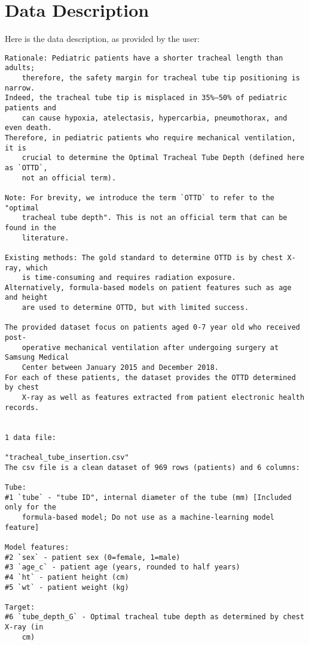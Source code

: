 \documentclass[11pt]{article}
\begin{document}
\clearpage
\appendix

\section{Data Description} \label{sec:data_description} Here is the data description, as provided by the user:

\begin{Verbatim}[tabsize=4]
Rationale: Pediatric patients have a shorter tracheal length than adults;
	therefore, the safety margin for tracheal tube tip positioning is narrow.
Indeed, the tracheal tube tip is misplaced in 35%–50% of pediatric patients and
	can cause hypoxia, atelectasis, hypercarbia, pneumothorax, and even death.
Therefore, in pediatric patients who require mechanical ventilation, it is
	crucial to determine the Optimal Tracheal Tube Depth (defined here as `OTTD`,
	not an official term).

Note: For brevity, we introduce the term `OTTD` to refer to the "optimal
	tracheal tube depth". This is not an official term that can be found in the
	literature.

Existing methods: The gold standard to determine OTTD is by chest X-ray, which
	is time-consuming and requires radiation exposure.
Alternatively, formula-based models on patient features such as age and height
	are used to determine OTTD, but with limited success.

The provided dataset focus on patients aged 0-7 year old who received post-
	operative mechanical ventilation after undergoing surgery at Samsung Medical
	Center between January 2015 and December 2018.
For each of these patients, the dataset provides the OTTD determined by chest
	X-ray as well as features extracted from patient electronic health records.


1 data file:

"tracheal_tube_insertion.csv"
The csv file is a clean dataset of 969 rows (patients) and 6 columns:

Tube:
#1 `tube` - "tube ID", internal diameter of the tube (mm) [Included only for the
	formula-based model; Do not use as a machine-learning model feature]

Model features:
#2 `sex` - patient sex (0=female, 1=male)
#3 `age_c` - patient age (years, rounded to half years)
#4 `ht` - patient height (cm)
#5 `wt` - patient weight (kg)

Target:
#6 `tube_depth_G` - Optimal tracheal tube depth as determined by chest X-ray (in
	cm)



\end{Verbatim}
\end{document}

